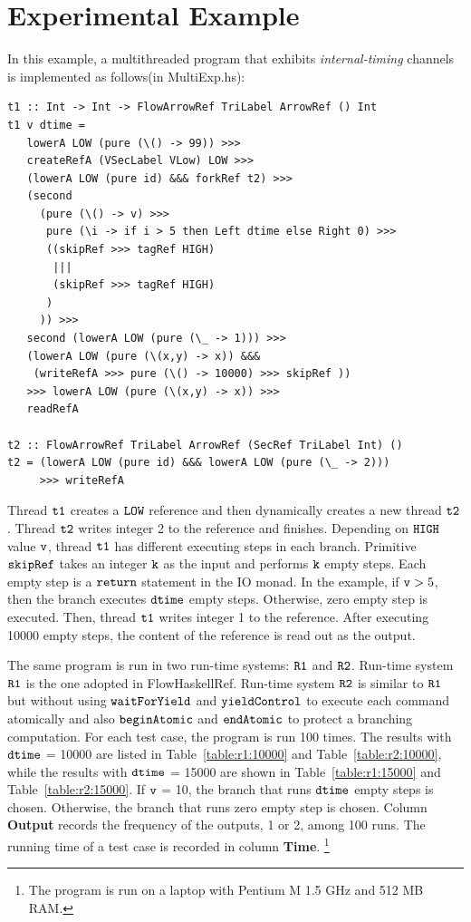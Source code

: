 \documentclass[a4paper]{report}
\newcommand{\co}[1]{$\cod{#1}$}
\begin{document}
\section{Experimental Example}
\label{chap8:expexample}
In this example, a multithreaded program that exhibits {\em internal-timing} channels is implemented
as follows(in MultiExp.hs):
\begin{Verbatim}[fontsize=\footnotesize]
t1 :: Int -> Int -> FlowArrowRef TriLabel ArrowRef () Int
t1 v dtime = 
   lowerA LOW (pure (\() -> 99)) >>>
   createRefA (VSecLabel VLow) LOW >>>
   (lowerA LOW (pure id) &&& forkRef t2) >>>
   (second
     (pure (\() -> v) >>>
      pure (\i -> if i > 5 then Left dtime else Right 0) >>>
      ((skipRef >>> tagRef HIGH)
       |||
       (skipRef >>> tagRef HIGH)
      )
     )) >>>
   second (lowerA LOW (pure (\_ -> 1))) >>> 
   (lowerA LOW (pure (\(x,y) -> x)) &&& 
    (writeRefA >>> pure (\() -> 10000) >>> skipRef ))
   >>> lowerA LOW (pure (\(x,y) -> x)) >>>
   readRefA 

t2 :: FlowArrowRef TriLabel ArrowRef (SecRef TriLabel Int) ()
t2 = (lowerA LOW (pure id) &&& lowerA LOW (pure (\_ -> 2))) 
     >>> writeRefA
\end{Verbatim}
Thread \co{t1} creates a \co{LOW} reference and then dynamically creates a new thread \co{t2}.
Thread \co{t2} writes integer 2 to the reference and finishes.
Depending on \co{HIGH} value \co{v}, thread \co{t1} has different executing steps in each branch.
Primitive \co{skipRef} takes an integer \co{k} as the input and performs \co{k} empty steps.
Each empty step is a \co{return} statement in the IO monad.
In the example, if $\mathtt{v}>5$, then the branch executes \co{dtime} empty steps. Otherwise, zero
empty step is executed. Then, thread \co{t1} writes integer 1 to the reference. After executing 10000
empty steps, the content of the reference is read out as the output.

The same program is run in two run-time systems: \co{R1} and \co{R2}.
Run-time system \co{R1} is the one adopted in FlowHaskellRef.
Run-time system \co{R2} is similar to \co{R1} but without using \co{waitForYield} and \co{yieldControl} to execute each
command atomically and also \co{beginAtomic} and \co{endAtomic} to protect a branching computation.
For each test case, the program is run 100 times. 
The results with \co{dtime} = 10000 are listed in Table~\ref{table:r1:10000} and Table~\ref{table:r2:10000},
while the results with \co{dtime} = 15000 are shown in Table~\ref{table:r1:15000} and Table~\ref{table:r2:15000}.
If \co{v} = 10, the branch that runs \co{dtime} empty steps is chosen. Otherwise, the branch that
runs zero empty step is chosen. Column {\bf Output} records the frequency of the outputs, 1 or 2, among
100 runs. The running time of a test case is recorded in column {\bf Time}.
\footnote{The program is run on a laptop with Pentium M 1.5 GHz and 512 MB RAM.}
\end{document}

